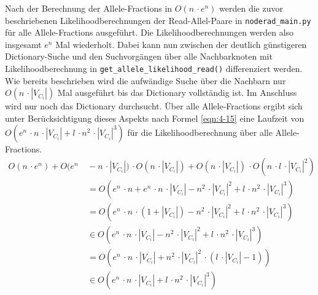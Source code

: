 Nach der Berechnung der Allele-Fractions in $O(n \, \cdotp e^n)$ werden die zuvor beschriebenen Likelihoodberechnungen der Read-Allel-Paare in \lstinline|noderad_main.py| für alle Allele-Fractions ausgeführt. Die Likelihoodberechnungen werden also insgesamt $ e^n $ Mal wiederholt. Dabei kann nun zwischen der deutlich günstigeren Dictionary-Suche und den Suchvorgängen über alle Nachbarknoten mit Likelihoodberechnung in \lstinline|get_allele_likelihood_read()| differenziert werden. Wie bereits beschrieben wird die aufwändige Suche über die Nachbarn nur $ O(n \,\cdotp |V_{C_{i}}|) $ Mal ausgeführt bis das Dictionary vollständig ist. Im Anschluss wird nur noch das Dictionary durchsucht. Über alle Allele-Fractions ergibt sich unter Berücksichtigung dieses Aspekts nach Formel \eqref{eqn:4-15} eine Laufzeit von $ O( e^n\, \cdotp n\, \cdotp |V_{C_{i}}| + l\, \cdotp n^2\, \cdotp |V_{C_{i}}|^3) $ für die Likelihoodberechnung über alle Allele-Fractions.
\begin{equation} \label{eqn:4-15}
\tag{4-15}
\begin{aligned}
O(n \, \cdotp e^n) + O(e^n &\ {} - n \,\cdotp |V_{C_{i}}|) \,  \cdotp O(n \,\cdotp |V_{C_{i}}|) + O(n \,\cdotp |V_{C_{i}}|) \, \cdotp O(n \,\cdotp l \,\cdotp |V_{C_{i}}|^2)\\
&\ = O(e^n\, \cdotp n + e^n \, \cdotp n \, \cdotp |V_{C_{i}}| - n^2 \, \cdotp |V_{C_{i}}|^2 + l \, \cdotp n^2\, \cdotp |V_{C_{i}}|^3)\\
&\ = O(e^n\, \cdotp n \, \cdotp(1 + |V_{C_{i}}|) - n^2 \, \cdotp |V_{C_{i}}|^2 + l\, \cdotp n^2 \, \cdotp |V_{C_{i}}|^3)\\
&\ \in O(e^n\, \cdotp n \, \cdotp |V_{C_{i}}| - n^2 \, \cdotp |V_{C_{i}}|^2 + l \, \cdotp n^2 \, \cdotp |V_{C_{i}}|^3)\\
&\ = O( e^n \, \cdotp n \, \cdotp |V_{C_{i}}| + n^2 \, \cdotp |V_{C_{i}}|^2 \,\cdotp (l \,\cdotp|V_{C_{i}}| - 1))\\
&\ \in O( e^n\, \cdotp n\, \cdotp |V_{C_{i}}| + l\, \cdotp n^2\, \cdotp |V_{C_{i}}|^3) 
\end{aligned}
\end{equation}

